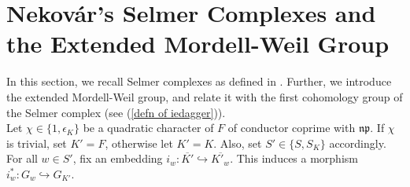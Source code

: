 \documentclass[reqno,10pt]{amsart}
\theoremstyle{plain}
\theoremstyle{definition}
\begin{document}
\section{Nekov\'ar's Selmer Complexes and the Extended Mordell-Weil Group} \label{sec 6}
In this section, we recall Selmer complexes as defined in \cite{Nekovar}. Further, we introduce the extended Mordell-Weil group, and relate it with the first cohomology group of the Selmer complex (see (\ref{defn of iedagger})).
\\
Let $\chi \in \{1,\epsilon_K\}$ be a quadratic character of $F$ of conductor coprime with $\mathfrak{np}$. If $\chi$ is trivial, set $K'=F$, otherwise let $K' = K$. Also, set $S' \in \{S,S_K\}$ accordingly. For all $w \in S'$, fix an embedding $i_w : \overline{K'} \hookrightarrow \overline{K'_w}$. This induces a morphism $i_w^* : G_w \hookrightarrow G_{K'}$. 
\end{document}
